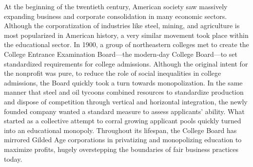 \documentclass[12pt, a4paper, twoside]{article}
\begin{document}
\maketitle{}

At the beginning of the twentieth century, American society saw massively expanding business and corporate consolidation in many economic sectors. Although the corporatization of industries like steel, mining, and agriculture is most popularized in American history, a very similar movement took place within the educational sector. In 1900, a group of northeastern colleges met to create the College Entrance Examination Board—the modern-day College Board—to set standardized requirements for college admissions. Although the original intent for the nonprofit was pure, to reduce the role of social inequalities in college admissions, the Board quickly took a turn towards monopolization. In the same manner that steel and oil tycoons combined resources to standardize production and dispose of competition through vertical and horizontal integration, the newly founded company wanted a standard measure to assess applicants' ability. What started as a collective attempt to corral growing applicant pools quickly turned into an educational monopoly. Throughout its lifespan, the College Board has mirrored Gilded Age corporations in privatizing and monopolizing education to maximize profits, hugely overstepping the boundaries of fair business practices today. 
\end{document}

